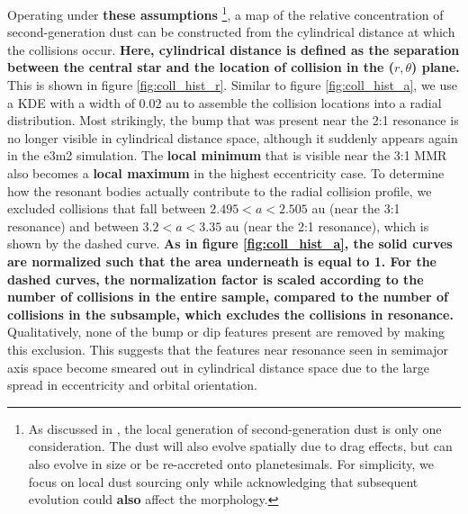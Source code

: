 \documentclass[fleqn,usenatbib]{mnras}
\begin{document}
Operating under \textbf{these assumptions} \footnote{As discussed in \cite{2017ApJ...850..103B}, the local generation of second-generation dust is only one 
consideration. The dust will also evolve spatially due to drag effects, but can also evolve in size or be re-accreted onto planetesimals. For simplicity, 
we focus on local dust sourcing only while acknowledging that subsequent evolution could \textbf{also} affect the morphology.}, a map of the relative concentration 
of second-generation dust can be constructed from the cylindrical distance at which the collisions occur. \textbf{Here, cylindrical distance is defined as the separation between the central 
star and the location of collision in the ($r, \theta$) plane.} This is shown in figure \ref{fig:coll_hist_r}. 
Similar to figure \ref{fig:coll_hist_a}, we use a KDE with a width of 0.02 au to assemble the collision locations into a radial distribution. Most 
strikingly, the bump that was present near the 2:1 resonance is no longer visible in cylindrical distance space, although it suddenly appears again in 
the e3m2 simulation. The \textbf{local minimum} that is visible near the 3:1 MMR also becomes a \textbf{local maximum} in the highest eccentricity case. To determine how the resonant 
bodies actually contribute to the radial collision profile, we excluded collisions that fall between $2.495 < a < 2.505$ au (near the 3:1 resonance) and 
between $3.2 < a < 3.35$ au (near the 2:1 resonance), which is shown by the dashed curve. \textbf{As in figure \ref{fig:coll_hist_a}, the solid curves are normalized such that the area 
underneath is equal to 1. For the dashed curves, the normalization factor is scaled according to the number of collisions in the entire sample, compared to the number of collisions in the 
subsample, which excludes the collisions in resonance.} Qualitatively, none of the bump or dip features present 
are removed by making this exclusion. This suggests that the features near resonance seen in semimajor axis space become smeared out in 
cylindrical distance space due to the large spread in eccentricity and orbital orientation.
\end{document}
